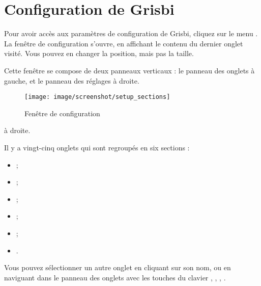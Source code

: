 
\chapter{Configuration de Grisbi\label{setup}}


Pour avoir accès aux paramètres de configuration de Grisbi, cliquez sur le menu . La fenêtre de configuration s'ouvre, en affichant le contenu du dernier onglet visité. Vous pouvez en changer la position, mais pas la taille. 

Cette fenêtre se compose de deux panneaux verticaux : le panneau des onglets à gauche, et le panneau des réglages \ifIllustration à droite.

\begin{figure}[htbp]
\begin{center}
\texttt{[image: image/screenshot/setup\_sections]}
\end{center}
\caption{Fenêtre de configuration}
\label{setup-sections-img}
\end{figure}
\else à droite.
\fi

Il y a vingt-cinq onglets qui sont regroupés en six sections :
\begin{itemize}
	\item {} ;
	\item {} ;
	\item {} ;
	\item {} ;
	\item {} ;
	\item {}.
\end{itemize}


Vous pouvez sélectionner un autre onglet en cliquant sur son nom, ou en naviguant dans le panneau des onglets avec les touches du clavier   , , , .

